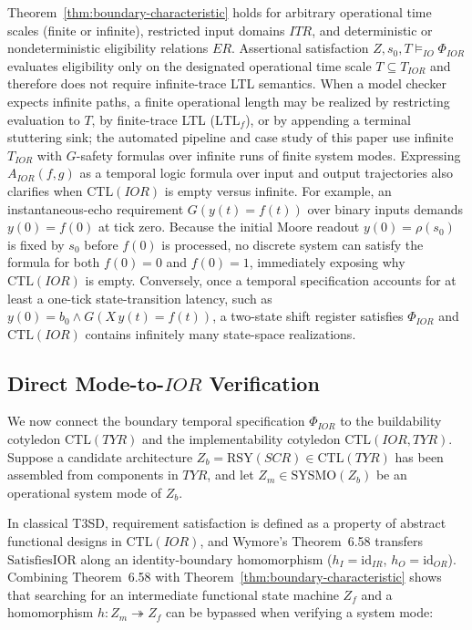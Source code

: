 Theorem~\ref{thm:boundary-characteristic} holds for arbitrary operational time scales (finite or infinite), restricted input domains $ITR$, and deterministic or nondeterministic eligibility relations $ER$. Assertional satisfaction $Z,s_0,T\models_{IO}\Phi_{IOR}$ evaluates eligibility only on the designated operational time scale $T\subseteq T_{IOR}$ and therefore does not require infinite-trace LTL semantics. When a model checker expects infinite paths, a finite operational length may be realized by restricting evaluation to $T$, by finite-trace LTL ($\mathrm{LTL}_f$), or by appending a terminal stuttering sink; the automated pipeline and case study of this paper use infinite $T_{IOR}$ with $G$-safety formulas over infinite runs of finite system modes. Expressing $A_{IOR}(f,g)$ as a temporal logic formula over input and output trajectories also clarifies when $\mathrm{CTL}(IOR)$ is empty versus infinite. For example, an instantaneous-echo requirement $G(y(t)=f(t))$ over binary inputs demands $y(0)=f(0)$ at tick zero. Because the initial Moore readout $y(0)=\rho(s_0)$ is fixed by $s_0$ before $f(0)$ is processed, no discrete system can satisfy the formula for both $f(0)=0$ and $f(0)=1$, immediately exposing why $\mathrm{CTL}(IOR)$ is empty. Conversely, once a temporal specification accounts for at least a one-tick state-transition latency, such as $y(0)=b_0\wedge G(X\,y(t)=f(t))$, a two-state shift register satisfies $\Phi_{IOR}$ and $\mathrm{CTL}(IOR)$ contains infinitely many state-space realizations.

\subsection{Direct Mode-to-\texorpdfstring{$IOR$}{IOR} Verification}
\label{sec:mode-ior-bridge}
We now connect the boundary temporal specification $\Phi_{IOR}$ to the buildability cotyledon $\mathrm{CTL}(TYR)$ and the implementability cotyledon $\mathrm{CTL}(IOR,TYR)$. Suppose a candidate architecture $Z_b=\mathrm{RSY}(SCR)\in\mathrm{CTL}(TYR)$ has been assembled from components in $TYR$, and let $Z_m\in\mathrm{SYSMO}(Z_b)$ be an operational system mode of $Z_b$.

In classical T3SD, requirement satisfaction is defined as a property of abstract functional designs in $\mathrm{CTL}(IOR)$, and Wymore's Theorem~6.58 transfers $\mathrm{SatisfiesIOR}$ along an identity-boundary homomorphism ($h_I=\mathrm{id}_{IR}$, $h_O=\mathrm{id}_{OR}$). Combining Theorem~6.58 with Theorem~\ref{thm:boundary-characteristic} shows that searching for an intermediate functional state machine $Z_f$ and a homomorphism $h:Z_m\twoheadrightarrow Z_f$ can be bypassed when verifying a system mode:

